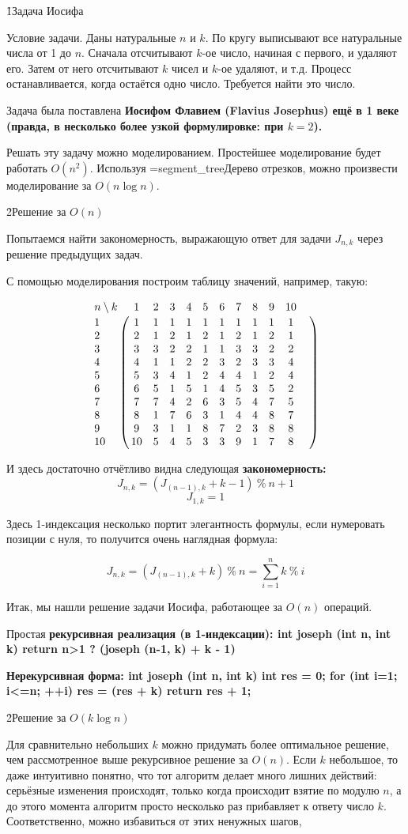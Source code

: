 \h1{Задача Иосифа}

Условие задачи. Даны натуральные $n$ и $k$. По кругу выписывают все натуральные числа от 1 до $n$. Сначала отсчитывают $k$-ое число, начиная с первого, и удаляют его. Затем от него отсчитывают $k$ чисел и $k$-ое удаляют, и т.д. Процесс останавливается, когда остаётся одно число. Требуется найти это число.

Задача была поставлена \bf{Иосифом Флавием} (Flavius Josephus) ещё в 1 веке (правда, в несколько более узкой формулировке: при $k = 2$).

Решать эту задачу можно моделированием. Простейшее моделирование будет работать $O (n^2)$. Используя \algohref=segment_tree{Дерево отрезков}, можно произвести моделирование за $O (n \log n)$.

\h2{Решение за $O(n)$}

Попытаемся найти закономерность, выражающую ответ для задачи $J_{n,k}$ через решение предыдущих задач.

С помощью моделирования построим таблицу значений, например, такую:

$$ \bordermatrix {
n \setminus k&1&2&3&4&5&6&7&8&9&10 \cr
1&1&1&1&1&1&1&1&1&1&1& \cr
2&2&1&2&1&2&1&2&1&2&1& \cr
3&3&3&2&2&1&1&3&3&2&2& \cr
4&4&1&1&2&2&3&2&3&3&4& \cr
5&5&3&4&1&2&4&4&1&2&4& \cr
6&6&5&1&5&1&4&5&3&5&2& \cr
7&7&7&4&2&6&3&5&4&7&5& \cr
8&8&1&7&6&3&1&4&4&8&7& \cr
9&9&3&1&1&8&7&2&3&8&8& \cr
10&10&5&4&5&3&3&9&1&7&8& \cr
} $$

И здесь достаточно отчётливо видна следующая \bf{закономерность}:
$$ J_{n,k} = \left( J_{(n-1),k} + k - 1 \right)\ \%\ n + 1 $$
$$ J_{1,k} = 1 $$

Здесь 1-индексация несколько портит элегантность формулы, если нумеровать позиции с нуля, то получится очень наглядная формула:

$$ J_{n,k} = \left( J_{(n-1),k} + k \right)\ \%\ n = \sum_{i=1}^n k\ \%\ i $$

Итак, мы нашли решение задачи Иосифа, работающее за $O (n)$ операций.

Простая \bf{рекурсивная реализация} (в 1-индексации):
\code
int joseph (int n, int k) {
	return n>1 ? (joseph (n-1, k) + k - 1) %
}
\endcode

\bf{Нерекурсивная форма}:
\code
int joseph (int n, int k) {
	int res = 0;
	for (int i=1; i<=n; ++i)
		res = (res + k) %
	return res + 1;
}
\endcode

\h2{Решение за $O(k \log n)$}

Для сравнительно небольших $k$ можно придумать более оптимальное решение, чем рассмотренное выше рекурсивное решение за $O(n)$. Если $k$ небольшое, то даже интуитивно понятно, что тот алгоритм делает много лишних действий: серьёзные изменения происходят, только когда происходит взятие по модулю $n$, а до этого момента алгоритм просто несколько раз прибавляет к ответу число $k$. Соответственно, можно избавиться от этих ненужных шагов, 

